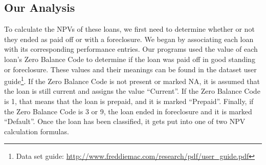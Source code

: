 \documentclass[12 pt]{uncw_thesis}
\theoremstyle{plain}
\theoremstyle{remark}
\theoremstyle{definition}
\begin{document}
\subsection{Our Analysis}
To calculate the NPVs of these loans, we first need to determine whether or not they ended as paid off or with a foreclosure. We began by associating each loan with its corresponding performance entries. Our programs used the value of each loan's Zero Balance Code to determine if the loan was paid off in good standing or foreclosure. These values and their meanings can be found in the dataset user guide\footnote{Data set guide: \href{http://www.freddiemac.com/research/pdf/user\_guide.pdf}{http://www.freddiemac.com/research/pdf/user\_guide.pdf}}. If the Zero Balance Code is not present or marked NA, it is assumed that the loan is still current and assigns the value ``Current''. If the Zero Balance Code is 1, that means that the loan is prepaid, and it is marked ``Prepaid''. Finally, if the Zero Balance Code is 3 or 9, the loan ended in foreclosure and it is marked ``Default''. Once the loan has been classified, it gets put into one of two NPV calculation formulas.
\end{document}
